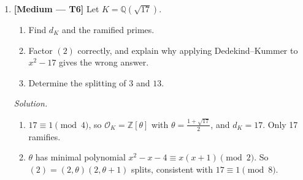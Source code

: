 \documentclass[11pt]{article}
\newcommand{\Z}{\mathbb{Z}}
\newcommand{\Q}{\mathbb{Q}}
\newcommand{\F}{\mathbb{F}}
\newcommand{\OK}{\mathcal{O}_K}
\begin{document}
\begin{enumerate}[label=\textbf{B\arabic*.}]
  \textit{Solution.}
  \begin{enumerate}[label=(\alph*)]
    \item $-23=[\OK:\Z[\alpha]]^2d_K$ and 23 is squarefree, so the index is 1.
    \item \begin{itemize}
      \item $p=2$: $\bar f=x^3+x+1$ has no root in $\F_2$ ($f(0)=f(1)=1$), so it is irreducible. Thus 2 is inert, with $f=3$.
      \item $p=5$: $f(2)=8-2-1=5\equiv0$. Dividing, $\bar f=(x-2)(x^2+2x+3)$. Check:
      \[
      (x-2)(x^2+2x+3)=x^3-x-6\equiv x^3-x-1\pmod 5.
      \]
      The quadratic has discriminant $4-12=-8\equiv2\pmod 5$, a non-square. So
      \[
      (5)=(5,\alpha-2)(5,\alpha^2+2\alpha+3),
      \]
      with residue degrees 1 and 2 and all $e=1$. Check: $1+2=3$.
      \item $p=23$: since $23\mid d_K$, the prime 23 ramifies, so $\bar f$ has a repeated root $r$. From $f'(r)=3r^2-1=0$ we get $r^2\equiv3^{-1}\equiv8\pmod{23}$, because $3\cdot8=24\equiv1$. Now $10^2=100=92+8$, so $r\equiv\pm10$.

      Test $r=10$: $f(10)=1000-10-1=989=23\cdot43\equiv0$. So 10 is the double root.

      The roots sum to 0 (there is no $x^2$ term), so the third root is $s\equiv-20\equiv3$. Check: $f(3)=27-3-1=23\equiv0$. So
      \[
      (23)=(23,\alpha-10)^2(23,\alpha-3),
      \]
      with $e=2,f=1$ and $e=1,f=1$. Check: $2+1=3$. The prime 23 ramifies but not totally.
    \end{itemize}
  \end{enumerate}

  \item \textbf{[Medium --- T6]} Let $K=\Q(\sqrt{17})$.
  \begin{enumerate}[label=(\alph*)]
    \item Find $d_K$ and the ramified primes.
    \item Factor $(2)$ correctly, and explain why applying Dedekind--Kummer to $x^2-17$ gives the wrong answer.
    \item Determine the splitting of $3$ and $13$.
  \end{enumerate}

  \textit{Solution.}
  \begin{enumerate}[label=(\alph*)]
    \item $17\equiv1\pmod 4$, so $\OK=\Z[\theta]$ with $\theta=\frac{1+\sqrt{17}}2$, and $d_K=17$. Only 17 ramifies.
    \item $\theta$ has minimal polynomial $x^2-x-4\equiv x(x+1)\pmod 2$. So $(2)=(2,\theta)(2,\theta+1)$ splits, consistent with $17\equiv1\pmod 8$.


\end{enumerate}
\end{enumerate}
\end{document}
